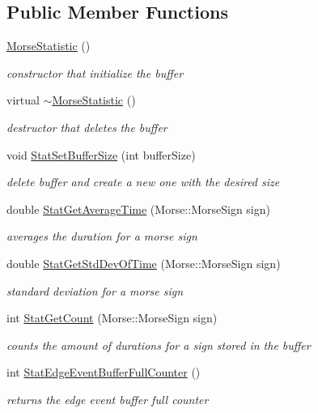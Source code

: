 \subsection*{Public Member Functions}
\begin{DoxyCompactItemize}
\item 
\hyperlink{classMorseStatistic_a48a3dc7e8f56e32caa91689593b07cff}{Morse\+Statistic} ()
\begin{DoxyCompactList}\small\item\em constructor that initialize the buffer \end{DoxyCompactList}\item 
virtual \hyperlink{classMorseStatistic_a9eb933dcacfbc2e124208f901faba46d}{$\sim$\+Morse\+Statistic} ()
\begin{DoxyCompactList}\small\item\em destructor that deletes the buffer \end{DoxyCompactList}\item 
void \hyperlink{classMorseStatistic_ae5f4ab08849cd2cb724748108309661e}{Stat\+Set\+Buffer\+Size} (int buffer\+Size)
\begin{DoxyCompactList}\small\item\em delete buffer and create a new one with the desired size \end{DoxyCompactList}\item 
double \hyperlink{classMorseStatistic_a3347edf33028378ec2009a67c7f5b14d}{Stat\+Get\+Average\+Time} (Morse\+::\+Morse\+Sign sign)
\begin{DoxyCompactList}\small\item\em averages the duration for a morse sign \end{DoxyCompactList}\item 
double \hyperlink{classMorseStatistic_af92781be60bdd00871dcb5907939dcb6}{Stat\+Get\+Std\+Dev\+Of\+Time} (Morse\+::\+Morse\+Sign sign)
\begin{DoxyCompactList}\small\item\em standard deviation for a morse sign \end{DoxyCompactList}\item 
int \hyperlink{classMorseStatistic_a541c0f03283b2327051bb30e2241753a}{Stat\+Get\+Count} (Morse\+::\+Morse\+Sign sign)
\begin{DoxyCompactList}\small\item\em counts the amount of durations for a sign stored in the buffer \end{DoxyCompactList}\item 
int \hyperlink{classMorseStatistic_a92064ea196420fa75a5950a8bdab874e}{Stat\+Edge\+Event\+Buffer\+Full\+Counter} ()
\begin{DoxyCompactList}\small\item\em returns the edge event buffer full counter \end{DoxyCompactList}\end{DoxyCompactItemize}
